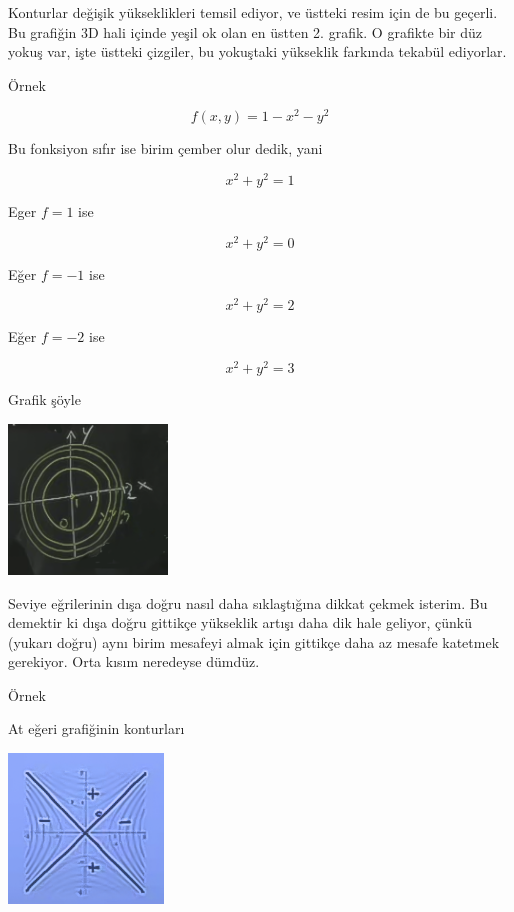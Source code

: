 \documentclass[12pt,fleqn]{article}\usepackage{../../common}
\begin{document}
Konturlar değişik yükseklikleri temsil ediyor, ve üstteki resim için de bu
geçerli. Bu grafiğin 3D hali içinde yeşil ok olan en üstten 2. grafik. O
grafikte bir düz yokuş var, işte üstteki çizgiler, bu yokuştaki yükseklik
farkında tekabül ediyorlar.

Örnek

$$ f(x,y) = 1-x^2-y^2 $$

Bu fonksiyon sıfır ise birim çember olur dedik, yani

$$ x^2+y^2=1 $$

Eger $f=1$ ise

$$ x^2+y^2=0 $$

Eğer $f=-1$ ise

$$ x^2+y^2=2 $$

Eğer $f=-2$ ise

$$ x^2+y^2=3 $$

Grafik şöyle

\begin{center}
\includegraphics[height=4cm]{8_12.png}
\end{center}

Seviye eğrilerinin dışa doğru nasıl daha sıklaştığına dikkat çekmek isterim. Bu
demektir ki dışa doğru gittikçe yükseklik artışı daha dik hale geliyor, çünkü
(yukarı doğru) aynı birim mesafeyi almak için gittikçe daha az mesafe katetmek
gerekiyor. Orta kısım neredeyse dümdüz.

Örnek

At eğeri grafiğinin konturları

\begin{center}
\includegraphics[height=4cm]{8_13.png}
\end{center}
\end{document}
